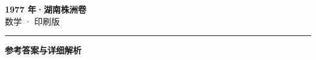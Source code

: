 \documentclass[zihao=5, a4paper]{ctexart}
\begin{document}
\begin{center}
  {\Large\bfseries 1977 年·湖南株洲卷}\\[4pt]
  {\large 数学 · 印刷版}
\end{center}
\medskip
{}

\par\bigskip\hrule\bigskip
{}
\begin{center}{\large\bfseries 参考答案与详细解析}\end{center}
\smallskip

\end{document}
